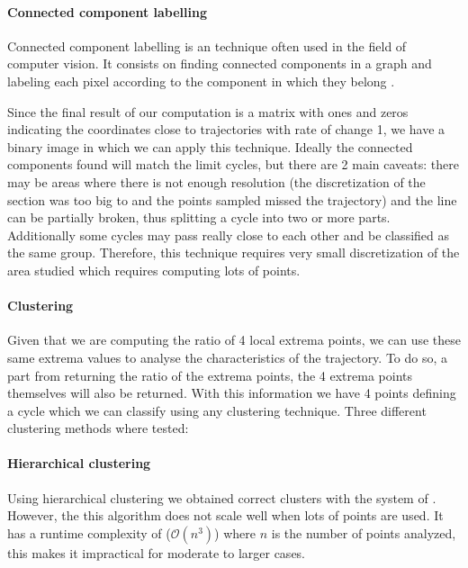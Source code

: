 \paragraph{Connected component labelling}


Connected component labelling is an technique often used in the field of computer
vision. It consists on finding connected components in a graph and labeling each pixel
according to the component in which they belong \cite{shapiro_connected_1996}.

Since the final result of our computation is a matrix with ones and zeros
indicating the coordinates close to trajectories with rate of change 1, we have
a binary image in which we can apply this technique. Ideally the connected
components found will match the limit cycles, but there are 2 main caveats:
there may be areas where there is not enough resolution (the discretization of
the section was too big to and the points sampled missed the trajectory) and the
line can be partially broken, thus splitting a cycle into two or more parts.
Additionally some cycles may pass really close to each other and be classified
as the same group. Therefore, this technique requires very small discretization
of the area studied which requires computing lots of points.

\paragraph{Clustering}
Given that we are computing the ratio of 4 local extrema points, we can use
these same extrema values to analyse the characteristics of the trajectory. To
do so, a part from returning the ratio of the extrema points, the 4 extrema
points themselves will also be returned. With this information we have 4 points
defining a cycle which we can classify using any clustering technique. Three
different clustering methods where tested:

\paragraph{Hierarchical clustering}

Using hierarchical clustering we obtained correct clusters with the system of
\cite{kuznetsov_visualization_2013}. However, the this algorithm does not scale
well when lots of points are used. It has a runtime complexity of
($\mathcal{O}(n^3)$) where $n$ is the number of points analyzed, this makes it
impractical for moderate to larger cases.

